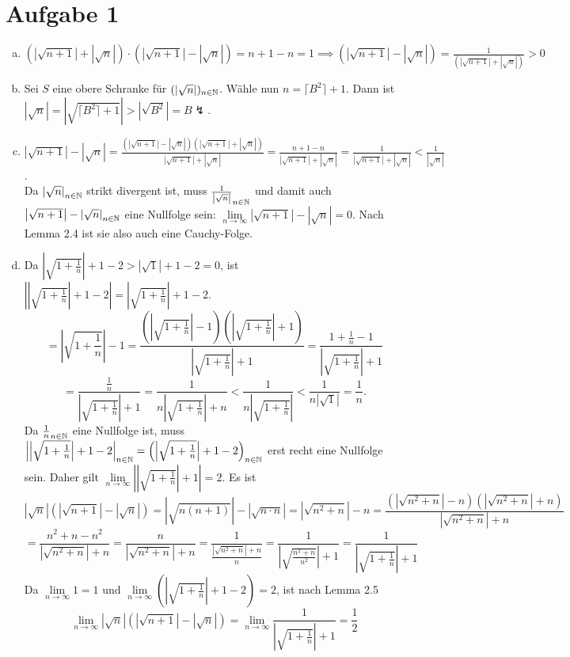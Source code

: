 \documentclass{article}
\newcommand{\mysqrt}[1]{\left|\sqrt{#1}\right|}
\begin{document}
	\section*{Aufgabe 1}
	\begin{enumerate}[a)]
		\item $(\mysqrt{n+1} + \mysqrt{n}) \cdot (\mysqrt{n+1} - \mysqrt{n}) = n+1 - n = 1 \implies (\mysqrt{n+1} - \mysqrt{n}) = \frac{1}{(\mysqrt{n+1} + \mysqrt{n})} > 0$
		\item Sei $S$ eine obere Schranke für $(\mysqrt{n})_{n\in \N}$. Wähle nun $n = \lceil B^2\rceil + 1$. Dann ist $\mysqrt{n} = \mysqrt{\lceil B^2\rceil +1} > \mysqrt{B^2} = B\lightning$.
		\item $\mysqrt{n+1}-\mysqrt{n} = \frac{(\mysqrt{n+1}-\mysqrt{n})(\mysqrt{n+1}+\mysqrt{n})}{\mysqrt{n+1}+\mysqrt{n}} = \frac{n+1-n}{\mysqrt{n+1}+\mysqrt{n}} = \frac{1}{\mysqrt{n+1}+\mysqrt{n}} < \frac{1}{\mysqrt{n}}$.\vspace*{5mm}\\
		Da $\mysqrt{n}_{n\in \N}$ strikt divergent ist, muss $\frac{1}{\mysqrt{n}}_{n\in\N}$ und damit auch $\mysqrt{n+1}-\mysqrt{n}_{n\in \N}$ eine Nullfolge sein: $\lim\limits_{n\to \infty} \mysqrt{n+1}-\mysqrt{n} = 0$.  Nach Lemma 2.4 ist sie also auch eine Cauchy-Folge. 
		\item Da $\mysqrt{1 + \frac{1}{n}} + 1 -2 > \mysqrt{1} + 1 -2 = 0$, ist $\left|\mysqrt{1 + \frac{1}{n}} + 1 - 2\right| = \mysqrt{1 + \frac{1}{n}} + 1 - 2$.
		\[=\mysqrt{1+\frac{1}{n}} -1 = \frac{\left(\mysqrt{1+\frac{1}{n}} -1\right)\left(\mysqrt{1+\frac{1}{n}} +1\right)}{\mysqrt{1+\frac{1}{n}} +1} = \frac{1 + \frac{1}{n} -1}{\mysqrt{1+\frac{1}{n}} +1}\]
		\[= \frac{\frac{1}{n}}{\mysqrt{1+\frac{1}{n}} +1} = \frac{1}{n\mysqrt{1+\frac{1}{n}} +n} < \frac{1}{n\mysqrt{1+\frac{1}{n}}}< \frac{1}{n\mysqrt{1}}= \frac{1}{n}.\]
		Da $\frac{1}{n}_{n\in \mathbb{N}}$ eine Nullfolge ist, muss $\left|\mysqrt{1 + \frac{1}{n}} + 1 - 2\right|_{n\in \N} = \left(\mysqrt{1 + \frac{1}{n}} + 1 - 2\right)_{n\in \N}$ erst recht eine Nullfolge sein. Daher gilt $\lim\limits_{n\to \infty} \left|\mysqrt{1 + \frac{1}{n}} + 1\right| = 2$. 
		Es ist \[\mysqrt{n}\left(\mysqrt{n+1}-\mysqrt{n}\right) = \mysqrt{n(n+1)} -\mysqrt{n\cdot n} = \mysqrt{n^2 + n} - n = \frac{\left(\mysqrt{n^2 + n} - n \right)\left(\mysqrt{n^2 + n} +n\right)}{\mysqrt{n^2 + n} + n}\]
		\[ = \frac{n^2 + n -n^2}{\mysqrt{n^2 + n} + n} = \frac{n}{\mysqrt{n^2 + n} + n} = \frac{1}{\frac{\mysqrt{n^2 + n} + n}{n}} = \frac{1}{\mysqrt{\frac{n^2 + n}{n^2}} + 1} = \frac{1}{\mysqrt{1 + \frac{1}{n}} + 1}\]
		Da $\lim\limits_{n\to \infty} 1 = 1$ und $\lim\limits_{n\to \infty} \left(\mysqrt{1 + \frac{1}{n}} + 1 - 2\right) = 2$, ist nach Lemma 2.5 
		\[\lim\limits_{n\to\infty} \mysqrt{n}\left(\mysqrt{n+1}-\mysqrt{n}\right) = \lim\limits_{n\to\infty} \frac{1}{\mysqrt{1 + \frac{1}{n}} + 1} = \frac{1}{2}\] 
	\end{enumerate}
\end{document}
